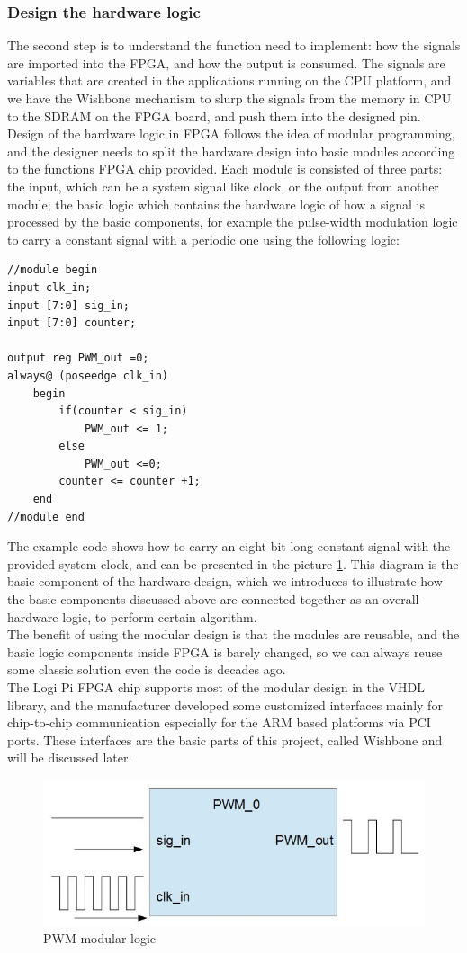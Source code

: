 \documentclass[11pt,openright,a4paper]{report}
\begin{document}
\subsubsection{Design the hardware logic}
The second step is to understand the function need to implement: how the signals are imported into the FPGA, and how the output is consumed. The signals are variables that are created in the applications running on the CPU platform, and we have the Wishbone mechanism to slurp the signals from the memory in CPU to the SDRAM on the FPGA board, and push them into the designed pin. \\
Design of the hardware logic in FPGA follows the idea of modular programming, and the designer needs to split the hardware design into basic modules according to the functions FPGA chip provided. Each module is consisted of three parts: the input, which can be a system signal like clock, or the output from another module; the basic logic which contains the hardware logic of how a signal is processed by the basic components, for example the pulse-width modulation logic to carry a constant signal with a periodic one using the following logic:
\begin{lstlisting}[breaklines,breakatwhitespace,caption={PWM module in Verilog},label=compression-psudoCode]
//module begin
input clk_in;
input [7:0] sig_in;
input [7:0] counter;

output reg PWM_out =0;
always@ (poseedge clk_in) 
	begin
		if(counter < sig_in)
			PWM_out <= 1;
		else
			PWM_out <=0;
		counter <= counter +1;
	end
//module end		
\end{lstlisting}  
The example code shows how to carry an eight-bit long constant signal with the provided system clock, and can be presented in the picture \ref{fig:pwm}. This diagram is the basic component of the hardware design, which we introduces to illustrate how the basic components discussed above are connected together as an overall hardware logic, to perform certain algorithm.\\
The benefit of using the modular design is that the modules are reusable, and the basic logic components inside FPGA is barely changed, so we can always reuse some classic solution even the code is decades ago.\\
The Logi Pi FPGA chip supports most of the modular design in the VHDL library, and the manufacturer developed some customized interfaces mainly for chip-to-chip communication especially for the ARM based platforms via PCI ports. These interfaces are the basic parts of this project, called Wishbone and will be discussed later.\\  
\begin{figure}[H]
\centering
\includegraphics[width=0.5\linewidth]{picture/pwm}
\caption{PWM modular logic}
\label{fig:pwm}
\end{figure}
\end{document}

